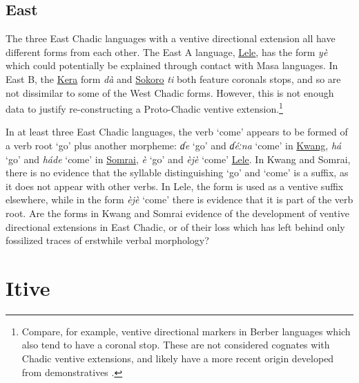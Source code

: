 \subsection{East}

The three East Chadic languages with a ventive directional extension all have different forms from each other. The East A language, \hyperref[lele]{Lele}, has the form \textit{yè} which could potentially be explained through contact with Masa languages. In East B, the \hyperref[kera]{Kera} form \textit{dà} and \hyperref[soko]{Sokoro} \textit{ti} both feature coronals stops, and so are not dissimilar to some of the West Chadic forms. However, this is not enough data to justify re-constructing a Proto-Chadic ventive extension.\footnote{Compare, for example, ventive directional markers in Berber languages which also tend to have a coronal stop. These are not considered cognates with Chadic ventive extensions, and likely have a more recent origin developed from demonstratives \citep{mettouchiGrammaticalizationDirectionalClitics2011}.} 

In at least three East Chadic languages, the verb `come' appears to be formed of a verb root `go' plus another morpheme: \textit{ɗe} `go' and \textit{ɗéːna} `come' in \hyperref[kwan]{Kwang}, \textit{há} `go' and \textit{háde} `come' in \hyperref[somr]{Somrai}, \textit{è} `go' and \textit{èjè} `come' \hyperref[lele]{Lele}. In Kwang and Somrai, there is no evidence that the syllable distinguishing `go' and `come' is a suffix, as it does not appear with other verbs. In Lele, the form is used as a ventive suffix elsewhere, while in the form \textit{èjè} `come' there is evidence that it is part of the verb root. Are the forms in Kwang and Somrai evidence of the development of ventive directional extensions in East Chadic, or of their loss which has left behind only fossilized traces of erstwhile verbal morphology?

\section{Itive}

